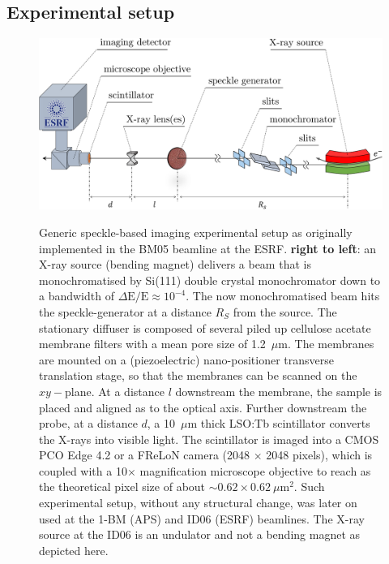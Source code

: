 \begin{refsection}
\subsection{Experimental setup}\label{sec:experimental_setup}

\begin{figure}[t]
        \centering
        {\includegraphics[width=0.7\linewidth]{figures/ch04/BM05.pdf}}
        \caption[Speckle-based imaging experimental setup at the BM05 beamline, ESRF.]{Generic speckle-based imaging experimental setup as originally implemented in the BM05 beamline at the ESRF. \textbf{right to left}: an X-ray source (bending magnet) delivers a beam that is  monochromatised by Si(111) double crystal monochromator down to a bandwidth of $\Delta \text{E}/\text{E}\approx10^{-4}$. The now monochromatised beam hits the speckle-generator at a distance $R_S$ from the source. The stationary diffuser is composed of several piled up cellulose acetate membrane filters with a mean pore size of 1.2~$\mu$m. The membranes are mounted on a (piezoelectric) nano-positioner transverse translation stage, so that the membranes can be scanned on the $xy-$plane. At a distance $l$ downstream the membrane, the sample is placed and aligned as to the optical axis. Further downstream the probe, at a distance $d$, a 10~$\mu$m thick LSO:Tb scintillator converts the X-rays into visible light. The scintillator is imaged into a CMOS PCO Edge 4.2 or a FReLoN camera (2048 $\times$ 2048 pixels), which is coupled with a 10$\times$ magnification microscope objective to reach as the theoretical pixel size of about $\sim0.62\times0.62~\mu$m$^2$. Such experimental setup, without any structural change, was later on used at the 1-BM (APS) and ID06 (ESRF) beamlines. The X-ray source at the ID06 is an undulator and not a bending magnet as depicted here.} \label{fig:BM05}
\end{figure}


\end{refsection}
